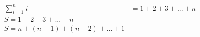 \documentclass{article}
\begin{document}
	\begin{align}
	\sum_{i = 1}^{n} i & = 1 + 2 + 3 + ... + n \\
	S = 1 + 2 + 3 + ... + n \\
	S = n + (n - 1) + (n - 2) + ... + 1 \\
	
	\end{align}
\end{document}
